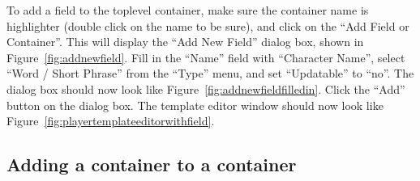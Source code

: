 To add a field to the toplevel container, make sure the container name
is highlighter (double click on the name to be sure), and click on the ``Add
Field or Container''.  This will display the ``Add New Field'' dialog
box, shown in Figure~\ref{fig:addnewfield}.  Fill in the ``Name'' field
with ``Character Name'', select ``Word / Short Phrase'' from the
``Type'' menu, and set ``Updatable'' to ``no''.  The dialog box should
now look like Figure~\ref{fig:addnewfieldfilledin}.  Click the ``Add''
button on the dialog box.  The template editor window should now look
like Figure~\ref{fig:playertemplateeditorwithfield}.

\subsection{Adding a container to a container}

